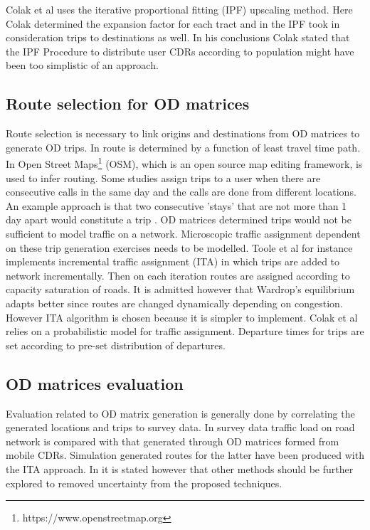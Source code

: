 \documentclass[12pt, a4paper]{report}
\theoremstyle{definition}
\theoremstyle{definition}%
\theoremstyle{definition}%
\theoremstyle{definition}%
\theoremstyle{definition}%
\theoremstyle{definition}%
\begin{document}
Colak et al uses the iterative proportional fitting (IPF) upscaling method. Here Colak determined the expansion factor for each tract and in the IPF took in consideration trips to destinations as well. In his conclusions Colak stated that the IPF Procedure to distribute user CDRs according to population might have been too simplistic of an approach.


\subsection{Route selection for OD matrices}
Route selection is necessary to link origins and destinations from OD matrices to generate OD trips. In \cite{Iqbal2014} route is determined by a function of least travel time path. In \cite{Toole2015} Open Street Maps\footnote{https://www.openstreetmap.org} (OSM), which is an open source map editing framework, is used to infer routing. Some studies assign trips to a user when there are consecutive calls in the same day and the calls are done from different locations. An example approach is that two consecutive 'stays' that are not more than 1 day apart would constitute a trip \cite{Colak2015,Toole2015}. 
OD matrices determined trips would not be sufficient to model traffic on a network. Microscopic traffic assignment dependent on these trip generation exercises needs to be modelled. Toole et al for instance implements incremental traffic assignment (ITA) in which trips are added to network incrementally. Then on each iteration routes are assigned according to capacity saturation of roads. It is admitted however that Wardrop's equilibrium  adapts better since routes are changed dynamically depending on congestion. However ITA algorithm is chosen because it is simpler to implement. Colak et al relies on a probabilistic model for traffic assignment. Departure times for trips are set according to pre-set distribution of departures.


\subsection{OD matrices evaluation}

Evaluation related to OD matrix generation is generally done by correlating the generated locations and trips to survey data. In \cite{Toole2015} survey data traffic load on road network is compared with that generated through OD matrices formed from mobile CDRs. Simulation generated routes for the latter have been produced with the ITA approach. In \cite{Toole2015} it is stated however that other methods should be further explored to removed uncertainty from the proposed techniques.
\end{document}
